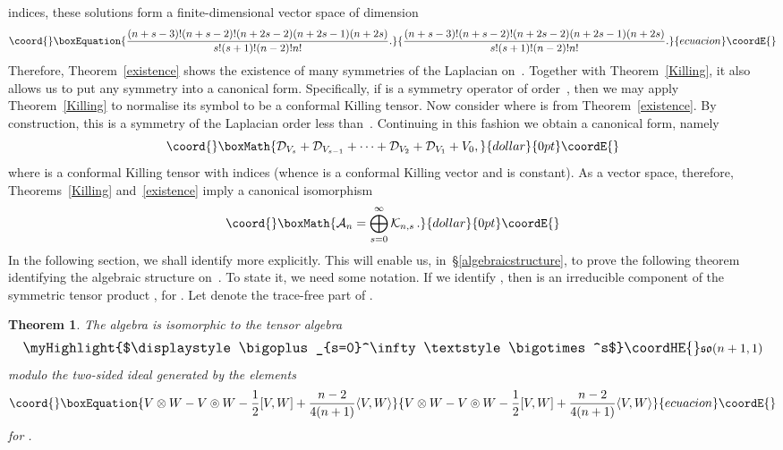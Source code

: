 \documentclass[a4paper,12pt]{amsart}
\newtheorem{thm}{Theorem}
\providecommand{\topten}{\circledcirc}
\begin{document}
indices, these solutions form a finite-dimensional vector space
\coordHE{} of dimension
\begin{equation}\coord{}\boxEquation{\label{dimension}
\frac{(n+s-3)!(n+s-2)!(n+2s-2)(n+2s-1)(n+2s)}{s!(s+1)!(n-2)!n!}.}{\frac{(n+s-3)!(n+s-2)!(n+2s-2)(n+2s-1)(n+2s)}{s!(s+1)!(n-2)!n!}.}{ecuacion}\coordE{}\end{equation}
Therefore, Theorem~\ref{existence} shows the existence of many symmetries of
the Laplacian on~\coordHE{}. Together with Theorem~\ref{Killing}, it also
allows us to put any symmetry into a canonical form. Specifically, if
\coordHE{} is a symmetry operator of order~\coordHE{}, then we may
apply Theorem~\ref{Killing} to normalise its symbol \coordHE{} to be a
conformal Killing tensor. Now consider \coordHE{} where
\coordHE{} is from Theorem~\ref{existence}. By construction, this is a
symmetry of the Laplacian order less than~\coordHE{}. Continuing in this fashion we
obtain a canonical form, namely
$$\coord{}\boxMath{{\mathcal D}_{V_s}+{\mathcal D}_{V_{s-1}}+\cdots+{\mathcal D}_{V_2}
+{\mathcal D}_{V_1}+V_0,}{dollar}{0pt}\coordE{}$$
where \coordHE{} is a conformal Killing tensor with \coordHE{} indices (whence \coordHE{} is a
conformal Killing vector and \coordHE{} is constant). As a vector space, therefore,
Theorems~\ref{Killing} and~\ref{existence} imply a canonical isomorphism
$$\coord{}\boxMath{{\mathcal A}_n=\bigoplus_{s=0}^\infty\mathcal K_{n,s}\,.}{dollar}{0pt}\coordE{}$$
In the following section, we shall identify \coordHE{} more
explicitly. This will enable us, in~\S\ref{algebraicstructure}, to prove the
following theorem identifying the algebraic structure on~\coordHE{}. To
state it, we need some notation. If we identify
\coordHE{}, then \coordHE{} is an
irreducible component of the symmetric tensor product \coordHE{}, for
\coordHE{}. Let \myHighlight{$V\topten W$}\coordHE{} denote the trace-free part of
\coordHE{}.
\begin{thm}\label{structure} The algebra \coordHE{} is isomorphic to the
tensor algebra
$$\mbox{\large\myHighlight{$\displaystyle \bigoplus_{s=0}^\infty
\textstyle\bigotimes^s$}\coordHE{}}{\mathfrak{so}}(n+1,1)$$
modulo the two-sided ideal generated by the elements
\begin{equation}\coord{}\boxEquation{\label{generators}V\otimes W-V\topten W-\frac{1}{2}[V,W]
+\frac{n-2}{4(n+1)}\langle V,W\rangle}{V\otimes W-V\topten W-\frac{1}{2}[V,W]
+\frac{n-2}{4(n+1)}\langle V,W\rangle}{ecuacion}\coordE{}\end{equation}
for \coordHE{}.
\end{thm}
\end{document}
